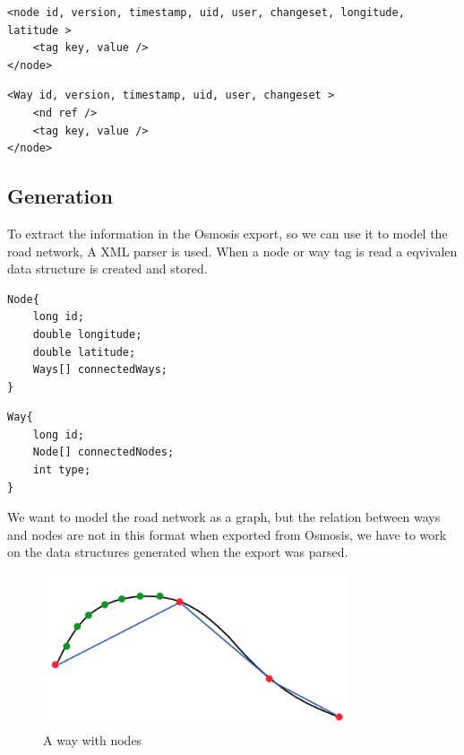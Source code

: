 \begin{lstlisting}[style=XML, caption=Node representation]
<node id, version, timestamp, uid, user, changeset, longitude, latitude >
	<tag key, value />
</node>
\end{lstlisting}

\begin{lstlisting}[style=XML, caption=Way representation]
<Way id, version, timestamp, uid, user, changeset >
	<nd ref />
	<tag key, value />
</node>
\end{lstlisting}

\subsection{Generation}
To extract the information in the Osmosis export, so we can use it to model the road network, A XML parser is used. When a node or way tag is read a eqvivalen data structure is created and stored. 
\begin{lstlisting}[style=java, caption=Datastructure for a node]
Node{
	long id;
	double longitude;
	double latitude;
	Ways[] connectedWays;
}
\end{lstlisting}

\begin{lstlisting}[style=java, caption=Datastructure for a way]
Way{
	long id;
	Node[] connectedNodes;
	int type;
}
\end{lstlisting}

We want to model the road network as a graph, but the relation between ways and nodes are not in this format when exported from Osmosis, we have to work on the data structures generated when the export was parsed.

\begin{figure}[h!]
  \centering
    \includegraphics[width=0.8\textwidth]{figures/way-w-nodes.png}
    \caption{A way with nodes}
    \label{fig:waywithnodes}
\end{figure}
